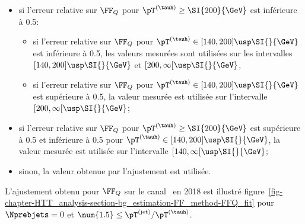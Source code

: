 \begin{itemize}
\item si l'erreur relative sur $\FF_Q$ pour $\pT^{(\tauh)}\geq\SI{200}{\GeV}$ est inférieure à \num{0.5}:
\begin{itemize}
\item si l'erreur relative sur $\FF_Q$ pour $\pT^{(\tauh)}\in[140, 200]\usp\SI{}{\GeV}$ est inférieure à \num{0.5}, les valeurs mesurées sont utilisées sur les intervalles $[140, 200]\usp\SI{}{\GeV}$ et $[200, \infty[\usp\SI{}{\GeV}$,
\item si l'erreur relative sur $\FF_Q$ pour $\pT^{(\tauh)}\in[140, 200]\usp\SI{}{\GeV}$ est supérieure à \num{0.5}, la valeur mesurée est utilisée sur l'intervalle $[200, \infty[\usp\SI{}{\GeV}$;
\end{itemize}
\item si l'erreur relative sur $\FF_Q$ pour $\pT^{(\tauh)}\geq\SI{200}{\GeV}$ est supérieure à \num{0.5}
et inférieure à \num{0.5} pour $\pT^{(\tauh)}\in[140, 200]\usp\SI{}{\GeV}$,
la valeur mesurée est utilisée sur l'intervalle $[140, \infty[\usp\SI{}{\GeV}$;
\item sinon, la valeur obtenue par l'ajustement est utilisée.
\end{itemize}
L'ajustement obtenu pour $\FF_Q$ sur le canal \mu\tauh\ en 2018 est illustré figure~\ref{fig-chapter-HTT_analysis-section-bg_estimation-FF_method-FFQ_fit} pour $\Nprebjets=0$ et $\num{1.5} \leq \pT^{(\text{jet})}/\pT^{(\tauh)}$.
